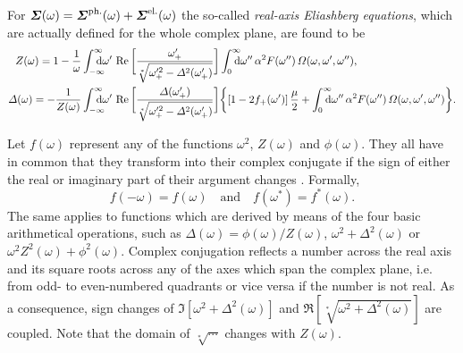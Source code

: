 For $\boldsymbol {\varSigma}(\omega) = \boldsymbol {\varSigma} \sp{\text{ph.}}(\omega) + \boldsymbol {\varSigma}
\sp{\text{el.}}(\omega)$ the so-called \emph{real-axis Eliashberg equations}, which
are actually defined for the whole complex plane, are found to be
%
\begin{align*}
    Z(\omega) = 1 - \frac 1 \omega
    &\int \from{-\infty} \till \infty \D \omega' \,
    \Re \bigg[
        \frac{\omega'_+}{\sqrt[*]{\omega'^2_+ - \Delta^2(\omega'_+)}}
    \bigg] \int \from 0 \till \infty \D \omega'' \, \alpha^2 F(\omega'') \,
    \Omega(\omega, \omega', \omega''),
    \\
    \Delta(\omega) = -\frac 1 {Z(\omega)}
    &\int \from{-\infty} \till \infty \D \omega' \,
    \Re \bigg[
        \frac{\Delta(\omega'_+)}{\sqrt[*]{\omega'^2_+ - \Delta^2(\omega'_+)}}
    \bigg]
    \bigg \{
        [1 - 2 f_+(\omega')] \, \frac \mu 2
        + \int \from 0 \till \infty \D \omega'' \, \alpha^2 F(\omega'') \,
        \Omega(\omega, \omega', \omega'')
    \bigg \}.
\end{align*}

Let $f(\omega)$ represent any of the functions $\omega^2$, $Z(\omega)$ and
$\phi(\omega)$. They all have in common that they transform into their complex
conjugate if the sign of either the real or imaginary part of their argument
changes \cite[Eq.~A5]{AmbegaokarTewordt64}. Formally,
%
\begin{equation*}
    f(-\omega) = f(\omega) \quad \text{and} \quad f(\omega^*) = f^*(\omega).
\end{equation*}
%
The same applies to functions which are derived by means of the four basic
arithmetical operations, such as $\Delta(\omega) = \phi(\omega) / Z(\omega)$,
$\omega^2 + \Delta^2(\omega)$ or $\omega^2 Z^2(\omega) + \phi^2(\omega)$.
Complex conjugation reflects a number across the real axis and its square roots
across any of the axes which span the complex plane, i.e. from odd- to
even-numbered quadrants or vice versa if the number is not real. As a
consequence, sign changes of $\Im[\omega^2 + \Delta^2(\omega)]$ and
$\Re[\sqrt[*]{\omega^2 + \Delta^2(\omega)}]$ are coupled. Note that the domain
of $\sqrt[*] \cdots$ changes with $Z(\omega)$.

